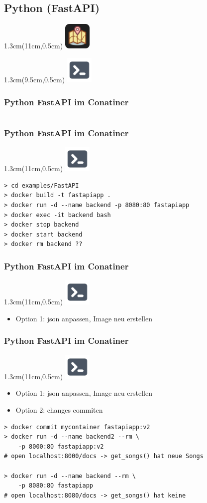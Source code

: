 \documentclass[22pt]{beamer}
\newcommand{\terminal}{
    \begin{textblock*}{1.3cm}(11cm,0.5cm) %
    \includegraphics[width=1.3cm]{Bilder/terminal.png}
    \end{textblock*}
}
\newcommand{\codeTerminal}{
    \begin{textblock*}{1.3cm}(11cm,0.5cm) %
        \includegraphics[width=1.3cm]{Bilder/CodeTour.png}
    \end{textblock*}
    \begin{textblock*}{1.3cm}(9.5cm,0.5cm) %
        \includegraphics[width=1.3cm]{Bilder/terminal.png}
    \end{textblock*}
}
\begin{document}
\subsection{Python (FastAPI)}
\begin{frame}[fragile]
    \codeTerminal
    \frametitle{Python FastAPI im Conatiner}
    \inputminted[fontsize=\footnotesize, frame=lines]{dockerfile}{../examples/FastAPI/Dockerfile}
    
\end{frame}

\begin{frame}[fragile]
    \frametitle{Python FastAPI im Conatiner}
    \terminal
\begin{verbatim}
> cd examples/FastAPI
> docker build -t fastapiapp .
> docker run -d --name backend -p 8080:80 fastapiapp
> docker exec -it backend bash
> docker stop backend
> docker start backend
> docker rm backend ??
\end{verbatim}
\end{frame}

\begin{frame}[fragile]
    \frametitle{Python FastAPI im Conatiner}
    \terminal
    \begin{itemize}
        \item Option 1: json anpassen, Image neu erstellen
    \end{itemize}

\end{frame}

\begin{frame}[fragile]
    \frametitle{Python FastAPI im Conatiner}
    \terminal
    \begin{itemize}
        \item Option 1: json anpassen, Image neu erstellen
        \item Option 2: changes commiten
    \end{itemize}

\begin{verbatim}
> docker commit mycontainer fastapiapp:v2
> docker run -d --name backend2 --rm \
    -p 8000:80 fastapiapp:v2
# open localhost:8000/docs -> get_songs() hat neue Songs

> docker run -d --name backend --rm \
    -p 8080:80 fastapiapp
# open localhost:8080/docs -> get_songs() hat keine
\end{verbatim}
\end{frame}
\end{document}
